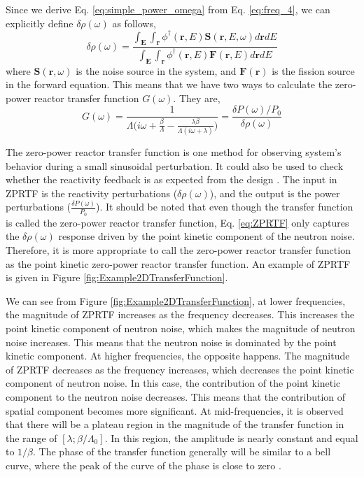 Since we derive Eq. \ref{eq:simple_power_omega} from Eq. \ref{eq:freq_4}, we can explicitly define $\delta \rho(\omega)$ as follows,
\begin{equation}
        \delta \rho(\omega) = \frac{\int_{\textbf{E}} \int_{\textbf{r}} \phi^{\dagger}(\textbf{r}, E) \textbf{S}(\textbf{r}, E, \omega) d\textbf{r} dE}{\int_{\textbf{E}} \int_{\textbf{r}} \phi^{\dagger}(\textbf{r}, E) \textbf{F}(\textbf{r}, E) d\textbf{r} dE}
\end{equation}
where $\textbf{S}(\textbf{r}, \omega)$ is the noise source in the system, and $\textbf{F}(\textbf{r})$  is the fission source in the forward equation. This means that we have two ways to calculate the zero-power reactor transfer function $G(\omega)$. They are,
\begin{equation}\label{eq:ZPRTF}
        G(\omega) = \frac{1}{\Lambda \biggl( i \omega +  \frac{\beta}{\Lambda} - \frac{\lambda \beta}{\Lambda (i \omega + \lambda)} \biggr)} = \frac{\delta P (\omega) /P_0}{\delta \rho(\omega)}
\end{equation}

The zero-power reactor transfer function is one method for observing system’s behavior during a small sinusoidal perturbation. It could also be used to check whether the reactivity feedback is as expected from the design \cite{bellNuclearReactorTheory1970}. The input in ZPRTF is the reactivity perturbations ($\delta \rho (\omega)$), and the output is the power perturbations ($\frac{\delta P(\omega)}{P_0}$). It should be noted that even though the transfer function is called the zero-power reactor transfer function, Eq. \ref{eq:ZPRTF} only captures the $\delta \rho (\omega)$ response driven by the point kinetic component of the neutron noise. Therefore, it is more appropriate to call the zero-power reactor transfer function as the point kinetic zero-power reactor transfer function. An example of ZPRTF is given in Figure \ref{fig:Example2DTransferFunction}.

We can see from Figure \ref{fig:Example2DTransferFunction}, at lower frequencies, the magnitude of ZPRTF increases as the frequency decreases. This increases the point kinetic component of neutron noise, which makes the magnitude of neutron noise increases. This means that the neutron noise is dominated by the point kinetic component. At higher frequencies, the opposite happens. The magnitude of ZPRTF decreases as the frequency increases, which decreases the point kinetic component of neutron noise. In this case, the contribution of the point kinetic component to the neutron noise decreases. This means that the contribution of spatial component becomes more significant. At mid-frequencies, it is observed that there will be a plateau region in the magnitude of the transfer function in the range of $[\lambda ; \beta/\Lambda_0]$. In this region, the amplitude is nearly constant and equal to $1/\beta$. The phase of the transfer function generally will be similar to a bell curve, where the peak of the curve of the phase is close to zero \cite{demaziereDevelopmentPointkineticVerification2017}.

